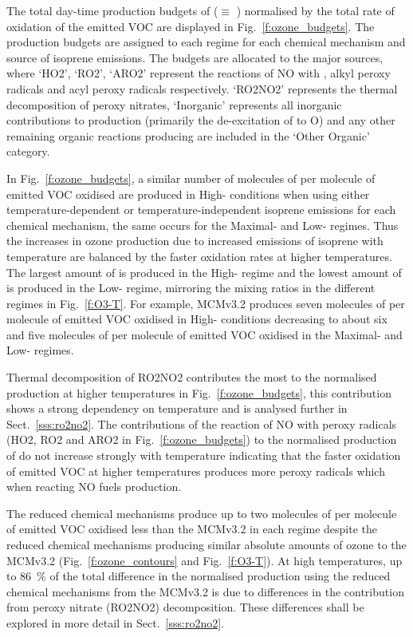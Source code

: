 The total day-time production budgets of  ($\equiv$ ) normalised by the total rate of oxidation of the emitted VOC are displayed in Fig.~\ref{f:ozone_budgets}.
The  production budgets are assigned to each  regime for each chemical mechanism and source of isoprene emissions.
The budgets are allocated to the major sources, where `HO2', `RO2', `ARO2' represent the reactions of NO with , alkyl peroxy radicals and acyl peroxy radicals respectively.
`RO2NO2' represents the thermal decomposition of peroxy nitrates, `Inorganic' represents all inorganic contributions to  production (primarily the de-excitation of  to O) and any other remaining organic reactions producing  are included in the `Other Organic' category.

In Fig.~\ref{f:ozone_budgets}, a similar number of molecules of  per molecule of emitted VOC oxidised are produced in High- conditions when using either temperature-dependent or temperature-independent isoprene emissions for each chemical mechanism, the same occurs for the Maximal- and Low- regimes.
Thus the increases in ozone production due to increased emissions of isoprene with temperature are balanced by the faster oxidation rates at higher temperatures.
The largest amount of  is produced in the High- regime and the lowest amount of  is produced in the Low- regime, mirroring the  mixing ratios in the different  regimes in Fig.~\ref{f:O3-T}.
For example, MCMv3.2 produces seven molecules of  per molecule of emitted VOC oxidised in High- conditions decreasing to about six and five molecules of  per molecule of emitted VOC oxidised in the Maximal- and Low- regimes.

Thermal decomposition of RO2NO2 contributes the most to the normalised  production at higher temperatures in Fig.~\ref{f:ozone_budgets}, this contribution shows a strong dependency on temperature and is analysed further in Sect.~\ref{sss:ro2no2}.
The contributions of the reaction of NO with peroxy radicals (HO2, RO2 and ARO2 in Fig.~\ref{f:ozone_budgets}) to the normalised production of  do not increase strongly with temperature indicating that the faster oxidation of emitted VOC at higher temperatures produces more peroxy radicals which when reacting NO fuels  production.

The reduced chemical mechanisms produce up to two molecules of  per molecule of emitted VOC oxidised less than the MCMv3.2 in each  regime despite the reduced chemical mechanisms producing similar absolute amounts of ozone to the MCMv3.2 (Fig.~\ref{f:ozone_contours} and Fig.~\ref{f:O3-T}).
At high temperatures, up to $86$~\% of the total difference in the normalised  production using the reduced chemical mechanisms from the MCMv3.2 is due to differences in the contribution from peroxy nitrate (RO2NO2) decomposition.
These differences shall be explored in more detail in Sect.~\ref{sss:ro2no2}.

